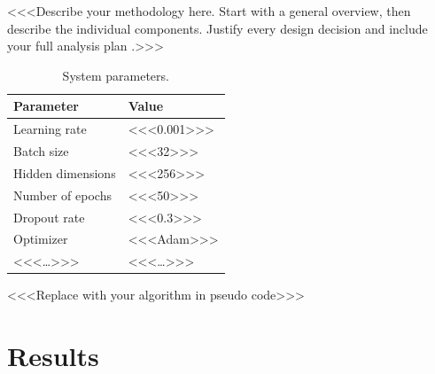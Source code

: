 \documentclass[12pt,a4paper,twocolumn]{article}
\begin{document}
\noindent
<<<Describe your methodology here. Start with a general overview, then
describe the individual components. Justify every design decision and
include your full analysis plan \cite{devlin2019}.>>>

\begin{table}[t]
  \caption{System parameters.}
  \label{tab:parameters}
  \centering
  \small
  \begin{tabular}{@{}ll@{}}
    \toprule
    \textbf{Parameter}      & \textbf{Value} \\
    \midrule
    Learning rate            & <<<0.001>>>    \\
    Batch size               & <<<32>>>       \\
    Hidden dimensions        & <<<256>>>      \\
    Number of epochs         & <<<50>>>       \\
    Dropout rate             & <<<0.3>>>      \\
    Optimizer                & <<<Adam>>>     \\
    <<<\ldots>>>             & <<<\ldots>>>   \\
    \bottomrule
  \end{tabular}
\end{table}

\begin{algorithm}[t]
  \caption{<<<Name of your algorithm>>>}
  \label{alg:example}
  <<<Replace with your algorithm in pseudo code>>>\;
  \;
\end{algorithm}


\section{Results}
\label{sec:results}
\end{document}
